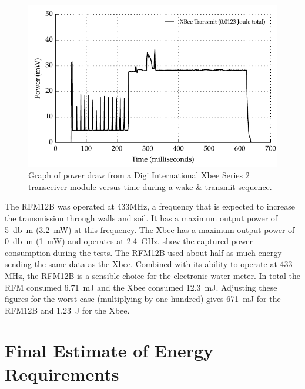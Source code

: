     \begin{figure}
      \centering
      \includegraphics{content/pt1/03-EnergyRequirements/graphics/Graph_XbeePower.pdf}
      \caption{\label{fig:Energy-consumed-XBee}Graph of power draw from a Digi International Xbee Series 2 transceiver module versus time during a wake \& transmit sequence.}
    \end{figure}

    The RFM12B was operated at 433MHz, a frequency that is expected to increase the transmission through walls and soil.
    It has a maximum output power of \SI{5}{\decibel m} (\SI{3.2}{\milli\watt}) at this frequency.
    The Xbee has a maximum output power of \SI{0}{\decibel m} (\SI{1}{\milli\watt}) and operates at \SI{2.4}{\giga\hertz}.
     show the captured power consumption during the tests.
    The RFM12B used about half as much energy sending the same data as the Xbee.
    Combined with its ability to operate at 433 MHz, the RFM12B is a sensible choice for the electronic water meter.
    In total the RFM consumed \SI{6.71}{\milli\joule} and the Xbee consumed \SI{12.3}{\milli\joule}.
    Adjusting these figures for the worst case (multiplying by one hundred) gives \SI{671}{\milli\joule} for the RFM12B and \SI{1.23}{\joule} for the Xbee.

  \section{Final Estimate of Energy Requirements}

